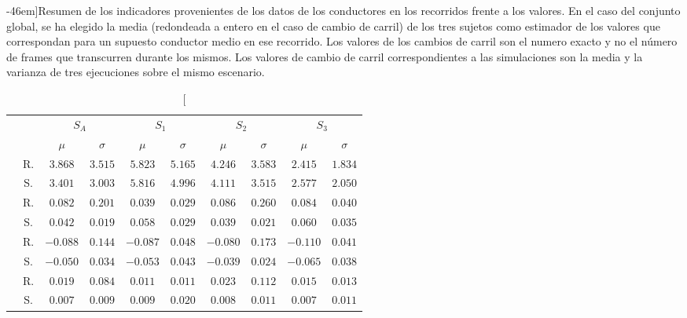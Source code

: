 \begin{table*}[!b]
	\centering
	\small
	\caption[Indicadores reales frente a indicadores capturados en simulación][-46em]{Resumen de los indicadores provenientes de los datos de los conductores en los recorridos frente a los valores. En el caso del conjunto global, se ha elegido la media (redondeada a entero en el caso de cambio de carril) de los tres sujetos como estimador de los valores que correspondan para un supuesto conductor medio en ese recorrido. Los valores de los cambios de carril son el numero exacto y no el número de frames que transcurren durante los mismos. Los valores de cambio de carril correspondientes a las simulaciones son la media y la varianza de tres ejecuciones sobre el mismo escenario.}
	\label{tbl:global-comparison-indicators}
	\begin{tabular}{cccccccccc}
		\toprule
		&                   & \multicolumn{2}{c}{$S_A$}    & \multicolumn{2}{c}{$S_1$}          & \multicolumn{2}{c}{$S_2$}        & \multicolumn{2}{c}{\textbf{$S_3$}}        \\
		\multicolumn{2}{l}{}                  & $\mu$     & $\sigma$ & $\mu$    & $\sigma$ & $\mu$     & $\sigma$  & $\mu$    & $\sigma$ \\
		\midrule
		\rowcolor{black!20} \cellcolor{white} \multirow{2}{*}{\textbf{$V$}}   & R. & $3.868$  & $3.515$  & $5.823$  & $5.165$  & $4.246$  & $3.583$  & $2.415$  & $1.834$  \\
		& S. & $3.401$  & $3.003$  & $5.816$  & $4.996$  & $4.111$  & $3.515$  & $2.577$  & $2.050$  \\
		\rowcolor{black!20} \cellcolor{white} \multirow{2}{*}{\textbf{$AP$}}  & R. & $0.082$  & $0.201$  & $0.039$  & $0.029$  & $0.086$  & $0.260$  & $0.084$  & $0.040$  \\
		& S. & $0.042$  & $0.019$  & $0.058$  & $0.029$  & $0.039$  & $0.021$  & $0.060$  & $0.035$  \\
		\rowcolor{black!20} \cellcolor{white} \multirow{2}{*}{\textbf{$AN$}}  & R. & $-0.088$ & $0.144$  & $-0.087$ & $0.048$  & $-0.080$ & $0.173$  & $-0.110$ & $0.041$  \\
		& S. & $-0.050$ & $0.034$  & $-0.053$ & $0.043$  & $-0.039$ & $0.024$  & $-0.065$ & $0.038$  \\
		\rowcolor{black!20} \cellcolor{white} \multirow{2}{*}{\textbf{$JIM$}} & R. & $0.019$  & $0.084$  & $0.011$  & $0.011$  & $0.023$  & $0.112$  & $0.015$  & $0.013$  \\
		& S. & $0.007$  & $0.009$  & $0.009$  & $0.020$  & $0.008$  & $0.011$  & $0.007$  & $0.011$  \\

\end{tabular}
\end{table*}
